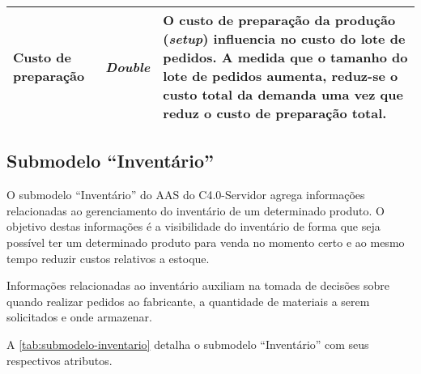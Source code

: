 \begin{table}[htb]
\begin{tabular}{p{3.5cm}p{1.5cm}p{9cm}}
		\hline
		Custo de preparação
		 & \textit{Double}
		 & O custo de preparação da produção (\textit{setup}) influencia no custo do lote de pedidos. A medida que o tamanho do lote de pedidos aumenta, reduz-se o custo total da demanda uma vez que reduz o custo de preparação total.                                                            \\

		\hline
	\end{tabular}
	\label{tab:submodelo-processos}
\end{table}

\newpage

\subsection{Submodelo ``Inventário''}

O submodelo ``Inventário'' do AAS do C4.0-Servidor agrega informações relacionadas ao gerenciamento do inventário de um determinado produto. O objetivo destas informações é a visibilidade do inventário de forma que seja possível ter um determinado produto para venda no momento certo e ao mesmo tempo reduzir custos relativos a estoque.

Informações relacionadas ao inventário auxiliam na tomada de decisões sobre quando realizar pedidos ao fabricante, a quantidade de materiais a serem solicitados e onde armazenar.

A \autoref{tab:submodelo-inventario} detalha o submodelo ``Inventário'' com seus respectivos atributos.

